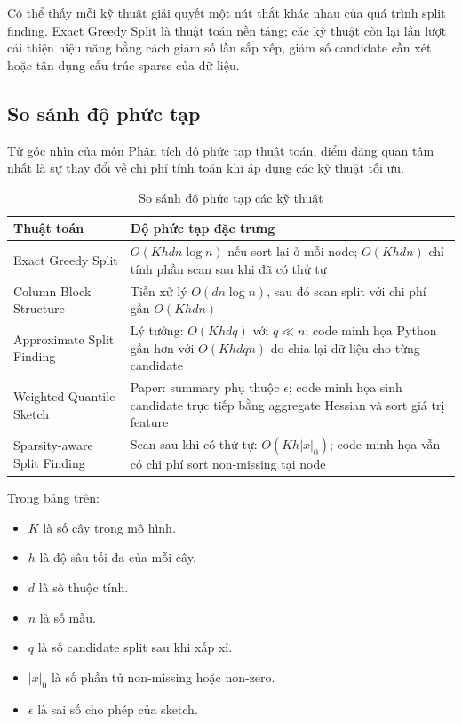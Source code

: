 Có thể thấy mỗi kỹ thuật giải quyết một nút thắt khác nhau của quá trình split finding. Exact Greedy Split là thuật toán nền tảng; các kỹ thuật còn lại lần lượt cải thiện hiệu năng bằng cách giảm số lần sắp xếp, giảm số candidate cần xét hoặc tận dụng cấu trúc sparse của dữ liệu.

\subsection{So sánh độ phức tạp}

Từ góc nhìn của môn Phân tích độ phức tạp thuật toán, điểm đáng quan tâm nhất là sự thay đổi về chi phí tính toán khi áp dụng các kỹ thuật tối ưu.

\begin{table}[htbp]
    \centering
    \caption{So sánh độ phức tạp các kỹ thuật}
    \label{tab:comparison_complexity}
    \begin{tabular}{p{4cm}p{8cm}}
        \toprule
        \textbf{Thuật toán} &
        \textbf{Độ phức tạp đặc trưng} \\
        \midrule

        Exact Greedy Split &
        $O(Khdn\log n)$ nếu sort lại ở mỗi node; $O(Khdn)$ chỉ tính phần scan sau khi đã có thứ tự \\

        Column Block Structure &
        Tiền xử lý $O(dn\log n)$, sau đó scan split với chi phí gần $O(Khdn)$ \\

        Approximate Split Finding &
        Lý tưởng: $O(Khdq)$ với $q \ll n$; code minh họa Python gần hơn với $O(Khdqn)$ do chia lại dữ liệu cho từng candidate \\

        Weighted Quantile Sketch &
        Paper: summary phụ thuộc $\epsilon$; code minh họa sinh candidate trực tiếp bằng aggregate Hessian và sort giá trị feature \\

        Sparsity-aware Split Finding &
        Scan sau khi có thứ tự: $O(Kh|x|_0)$; code minh họa vẫn có chi phí sort non-missing tại node \\

        \bottomrule
    \end{tabular}
\end{table}

Trong bảng trên:

\begin{itemize}
    \item $K$ là số cây trong mô hình.
    \item $h$ là độ sâu tối đa của mỗi cây.
    \item $d$ là số thuộc tính.
    \item $n$ là số mẫu.
    \item $q$ là số candidate split sau khi xấp xỉ.
    \item $|x|_0$ là số phần tử non-missing hoặc non-zero.
    \item $\epsilon$ là sai số cho phép của sketch.
\end{itemize}

